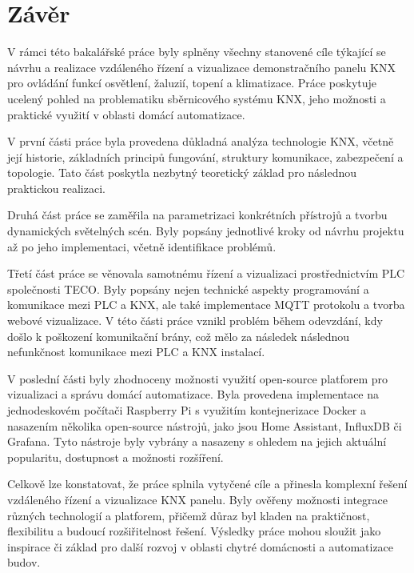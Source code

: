 \chapter*{Závěr}
{}

V rámci této bakalářské práce byly splněny všechny stanovené cíle týkající se návrhu a realizace vzdáleného řízení a vizualizace demonstračního panelu KNX pro ovládání funkcí osvětlení, žaluzií, topení a klimatizace. Práce poskytuje ucelený pohled na problematiku sběrnicového systému KNX, jeho možnosti a praktické využití v oblasti domácí automatizace. 

V první části práce byla provedena důkladná analýza technologie KNX, včetně její historie, základních principů fungování, struktury komunikace, zabezpečení a topologie. Tato část poskytla nezbytný teoretický základ pro následnou praktickou realizaci. 

Druhá část práce se zaměřila na parametrizaci konkrétních přístrojů a tvorbu dynamických světelných scén. Byly popsány jednotlivé kroky od návrhu projektu až po jeho implementaci, včetně identifikace problémů. 

Třetí část práce se věnovala samotnému řízení a vizualizaci prostřednictvím PLC společnosti TECO. Byly popsány nejen technické aspekty programování a komunikace mezi PLC a KNX, ale také implementace MQTT protokolu a tvorba webové vizualizace. V této části práce vznikl problém během odevzdání, kdy došlo k poškození komunikační brány, což mělo za následek následnou nefunkčnost komunikace mezi PLC a KNX instalací.

V poslední části byly zhodnoceny možnosti využití open-source platforem pro vizualizaci a správu domácí automatizace. Byla provedena implementace na jednodeskovém počítači Raspberry Pi s využitím kontejnerizace Docker a nasazením několika open-source nástrojů, jako jsou Home Assistant, InfluxDB či Grafana. Tyto nástroje byly vybrány a nasazeny s ohledem na jejich aktuální popularitu, dostupnost a možnosti rozšíření.

Celkově lze konstatovat, že práce splnila vytyčené cíle a přinesla komplexní řešení vzdáleného řízení a vizualizace KNX panelu. Byly ověřeny možnosti integrace různých technologií a platforem, přičemž důraz byl kladen na praktičnost, flexibilitu a budoucí rozšiřitelnost řešení. Výsledky práce mohou sloužit jako inspirace či základ pro další rozvoj v oblasti chytré domácnosti a automatizace budov.
